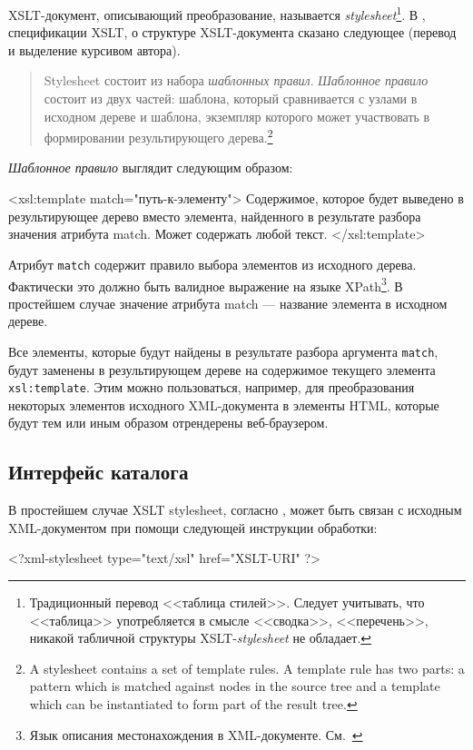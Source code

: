 \documentclass[a4paper,14pt,oneside]{extreport}
\begin{document}
XSLT-документ, описывающий преобразование, называется \textit{stylesheet}\footnote{Традиционный перевод <<таблица стилей>>. Следует учитывать, что <<таблица>> употребляется в смысле <<сводка>>, <<перечень>>, никакой табличной структуры XSLT-\textit{stylesheet} не обладает.}. В \cite{XSLT-spec}, спецификации XSLT, о структуре XSLT-документа сказано следующее (перевод и выделение курсивом автора).
\begin{quote}
Stylesheet состоит из набора \textit{шаблонных правил}. \textit{Шаблонное правило} состоит из двух частей: шаблона, который сравнивается с узлами в исходном дереве и шаблона, экземпляр которого может участвовать в формировании результирующего дерева.\footnote{A stylesheet contains a set of template rules. A template rule has two parts: a pattern which is matched against nodes in the source tree and a template which can be instantiated to form part of the result tree.}
\end{quote}

\textit{Шаблонное правило} выглядит следующим образом:

\begin{VerbatimCode}
<xsl:template match="путь-к-элементу">
	Содержимое, которое будет выведено 
	в результирующее дерево вместо элемента,
	найденного в результате разбора
	значения атрибута match. Может содержать любой текст.
</xsl:template>
\end{VerbatimCode}

Атрибут \verb'match' содержит правило выбора элементов из исходного дерева. Фактически это должно быть валидное выражение на языке XPath\footnote{Язык описания местонахождения в XML-документе. См.~\cite{XPath-spec}}. В простейшем случае значение атрибута match --- название элемента в исходном дереве.

Все элементы, которые будут найдены в результате разбора аргумента \verb'match', будут заменены в результирующем дереве на содержимое текущего элемента \verb'xsl:template'. Этим можно пользоваться, например, для преобразования некоторых элементов исходного XML-документа в элементы HTML, которые будут тем или иным образом отрендерены веб-браузером.

\subsection{Интерфейс каталога}
В простейшем случае XSLT stylesheet, согласно \cite{XML-style-spec}, может быть связан с исходным XML-документом при помощи следующей инструкции обработки:
\begin{VerbatimCode}
<?xml-stylesheet type="text/xsl" href="XSLT-URI" ?>
\end{VerbatimCode}
\end{document}
